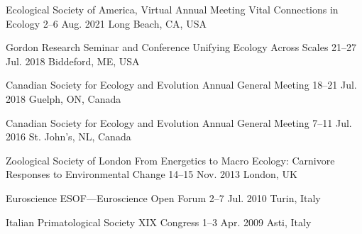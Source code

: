 

\begin{cventries}

  \cventry
    {Ecological Society of America, Virtual Annual Meeting} %
    {Vital Connections in Ecology} %
    {2--6 Aug. 2021} %
    {Long Beach, CA, USA} %
    {
    }

  \cventry
    {Gordon Research Seminar and Conference} %
    {Unifying Ecology Across Scales} %
    {21--27 Jul. 2018} %
    {Biddeford, ME, USA} %
    {
    }

  \cventry
    {Canadian Society for Ecology and Evolution} %
    {Annual General Meeting} %
    {18--21 Jul. 2018} %
    {Guelph, ON, Canada} %
    {
    }

  \cventry
    {Canadian Society for Ecology and Evolution} %
    {Annual General Meeting} %
    {7--11 Jul. 2016} %
    {St. John's, NL, Canada} %
    {
    }

  \cventry
    {Zoological Society of London} %
    {From Energetics to Macro Ecology: Carnivore Responses to Environmental Change} %
    {14--15 Nov. 2013} %
    {London, UK} %
    {
    }

  \cventry
    {Euroscience} %
    {ESOF---Euroscience Open Forum} %
    {2--7 Jul. 2010} %
    {Turin, Italy} %
    {
    }

  \cventry
    {Italian Primatological Society} %
    {XIX Congress} %
    {1--3 Apr. 2009} %
    {Asti, Italy} %
    {
    }

\end{cventries}
